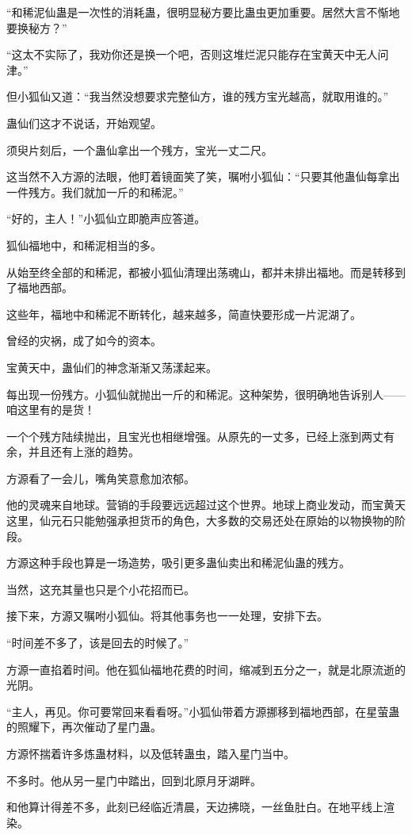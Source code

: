 \begin{this_body}
“和稀泥仙蛊是一次性的消耗蛊，很明显秘方要比蛊虫更加重要。居然大言不惭地要换秘方？”

“这太不实际了，我劝你还是换一个吧，否则这堆烂泥只能存在宝黄天中无人问津。”

但小狐仙又道：“我当然没想要求完整仙方，谁的残方宝光越高，就取用谁的。”

蛊仙们这才不说话，开始观望。

须臾片刻后，一个蛊仙拿出一个残方，宝光一丈二尺。

这当然不入方源的法眼，他盯着镜面笑了笑，嘱咐小狐仙：“只要其他蛊仙每拿出一件残方。我们就加一斤的和稀泥。”

“好的，主人！”小狐仙立即脆声应答道。

狐仙福地中，和稀泥相当的多。

从始至终全部的和稀泥，都被小狐仙清理出荡魂山，都并未排出福地。而是转移到了福地西部。

这些年，福地中和稀泥不断转化，越来越多，简直快要形成一片泥湖了。

曾经的灾祸，成了如今的资本。

宝黄天中，蛊仙们的神念渐渐又荡漾起来。

每出现一份残方。小狐仙就抛出一斤的和稀泥。这种架势，很明确地告诉别人——咱这里有的是货！

一个个残方陆续抛出，且宝光也相继增强。从原先的一丈多，已经上涨到两丈有余，并且还有上涨的趋势。

方源看了一会儿，嘴角笑意愈加浓郁。

他的灵魂来自地球。营销的手段要远远超过这个世界。地球上商业发动，而宝黄天这里，仙元石只能勉强承担货币的角色，大多数的交易还处在原始的以物换物的阶段。

方源这种手段也算是一场造势，吸引更多蛊仙卖出和稀泥仙蛊的残方。

当然，这充其量也只是个小花招而已。

接下来，方源又嘱咐小狐仙。将其他事务也一一处理，安排下去。

“时间差不多了，该是回去的时候了。”

方源一直掐着时间。他在狐仙福地花费的时间，缩减到五分之一，就是北原流逝的光阴。

“主人，再见。你可要常回来看看呀。”小狐仙带着方源挪移到福地西部，在星萤蛊的照耀下，再次催动了星门蛊。

方源怀揣着许多炼蛊材料，以及低转蛊虫，踏入星门当中。

不多时。他从另一星门中踏出，回到北原月牙湖畔。

和他算计得差不多，此刻已经临近清晨，天边拂晓，一丝鱼肚白。在地平线上渲染。


\end{this_body}
